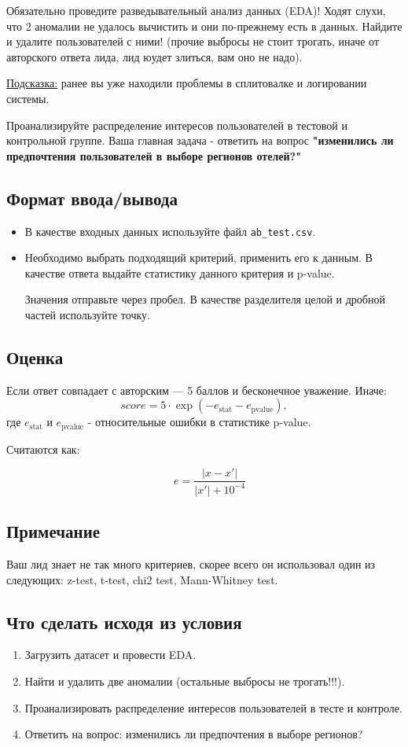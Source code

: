 \documentclass[pract]{SCWorks}
\begin{document}
Обязательно проведите разведывательный анализ данных (EDA)! Ходят слухи, что 2 аномалии не удалось вычистить
и они по-прежнему есть в данных. Найдите и удалите пользователей с ними! (прочие выбросы не стоит трогать, иначе
от авторского ответа лида, лид юудет злиться, вам оно не надо).

\underline{Подсказка:} ранее вы уже находили проблемы в сплитовалке и логировании системы.

Проанализируйте распределение интересов пользователей в тестовой и контрольной группе. Ваша главная задача
- ответить на вопрос \textbf{"изменились ли предпочтения пользователей в выборе регионов отелей?"}

\subsection*{Формат ввода/вывода}
\begin{itemize}
    \item В качестве входных данных используйте файл \texttt{ab\_test.csv}.
    \item Необходимо выбрать подходящий  критерий, применить его к данным. В качестве ответа выдайте статистику 
    данного критерия и p-value. 
    
    Значения отправьте через пробел. В качестве разделителя целой и дробной
    частей используйте точку.
\end{itemize}

\subsection*{Оценка}
Если ответ совпадает с авторским — 5 баллов и бесконечное уважение. Иначе:
\[
score = 5 \cdot \exp(-e_{\text{stat}} - e_{\text{pvalue}}),
\]
где $e_{\text{stat}}$ и $e_{\text{pvalue}}$ - относительные ошибки в статистике p-value.

Считаются как:

\[
\quad e = \frac{|x - x'|}{|x'| + 10^{-4}}
\]

\subsection*{Примечание}

Ваш лид знает не так много критериев, скорее всего он использовал один из следующих: z-test, t-test, chi2 test, Mann-Whitney test.

\subsection*{Что сделать исходя из условия}
\begin{enumerate}
    \item Загрузить датасет и провести EDA.
    \item Найти и удалить две аномалии (остальные выбросы не трогать!!!).
    \item Проанализировать распределение интересов пользователей в тесте и контроле.
    \item Ответить на вопрос: изменились ли предпочтения в выборе регионов?
\end{enumerate}
\end{document}
